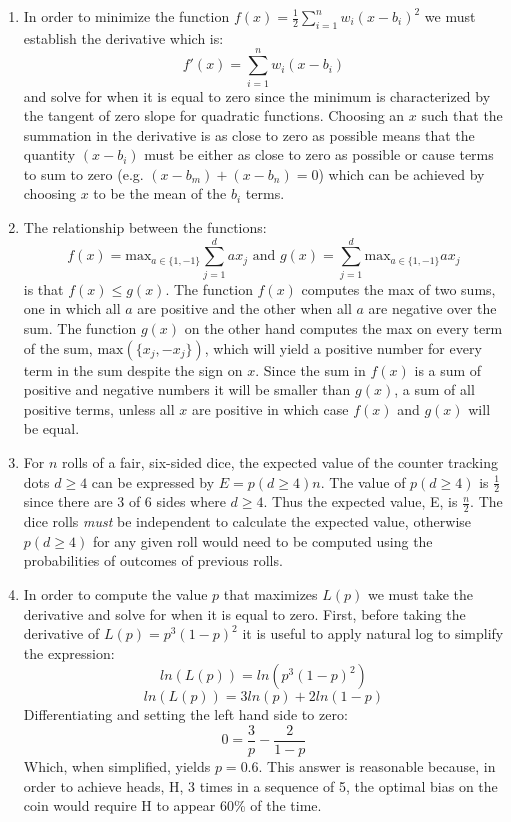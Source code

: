 \documentclass[12pt]{article}
\begin{document}
\begin{enumerate}[label=(\alph*)]
  \item In order to minimize the function
		\(f(x) = \frac{1}{2}\sum_{i=1}^{n}w_i(x-b_i)^2\)
		we must establish the derivative which is:
		\[f'(x) = \sum_{i=1}^{n}w_i(x-b_i)\]
		and solve for when it is equal to zero since the minimum is characterized
		by the tangent of zero slope for quadratic functions. Choosing
		an \(x\) such that the summation in the derivative is as close to zero as
		possible means that the quantity \((x-b_i)\) must be either as close to
		zero as possible or cause terms to sum to zero
		(e.g. \((x-b_m) + (x-b_n) = 0\))
		which can be achieved by choosing
		\(x\) to be the mean of the \(b_i\) terms.

		\item The relationship between the functions:
		\[
			f(x)=\text{max}_{a\in\{1,-1\}}\sum_{j=1}^dax_j
			\text{ and }
			g(x)=\sum_{j=1}^d\text{max}_{a\in\{1,-1\}}ax_j
		\]
		is that \(f(x) \leq g(x)\). The function \(f(x)\) computes the max
		of two sums, one in which all \(a\) are positive and the other when
		all \(a\) are negative over the sum.
		The function \(g(x)\) on the other hand
		computes the max on every term of the sum,
		\(\text{max}(\{x_j, -x_j\})\),
		which will yield a positive number for every term in the sum
		despite the sign on \(x\). Since the
		sum in \(f(x)\) is a sum of positive and negative numbers it will be
		smaller than \(g(x)\), a sum of all positive terms, unless all \(x\)
		are positive in which case \(f(x)\) and \(g(x)\) will be equal.

  \item For \(n\) rolls of a fair, six-sided dice, the expected value of the
		counter tracking dots \(d\geq4\) can be expressed by \(E = p(d\geq4)n\).
		The value of \(p(d\geq4)\) is \(\frac{1}{2}\) since there are 3 of 6 sides where
		\(d\geq4\). Thus the expected value, E, is \(\frac{n}{2}\). The dice
		rolls \textit{must} be independent to calculate the expected
		value, otherwise \(p(d\geq4)\) for any given roll would need to be computed
		using the probabilities of outcomes of previous rolls.

  \item In order to compute the value \(p\) that maximizes \(L(p)\) we must
		take the derivative and solve for when it is equal to zero. First, before
		taking the derivative of \(L(p)=p^3(1-p)^2\) it is useful to apply
		natural log to simplify the expression:
		\[ln(L(p))=ln(p^3(1-p)^2)\]
		\[ln(L(p))=3ln(p) + 2ln(1-p)\]
		Differentiating and setting the left hand side to zero:
		\[0 = \frac{3}{p} - \frac{2}{1-p}\]
		Which, when simplified, yields \(p=0.6\). This answer is reasonable because,
		in order to achieve heads, H, 3 times in a sequence of 5, the
		optimal bias on the coin would require H to appear 60\% of the time.


\end{enumerate}
\end{document}
